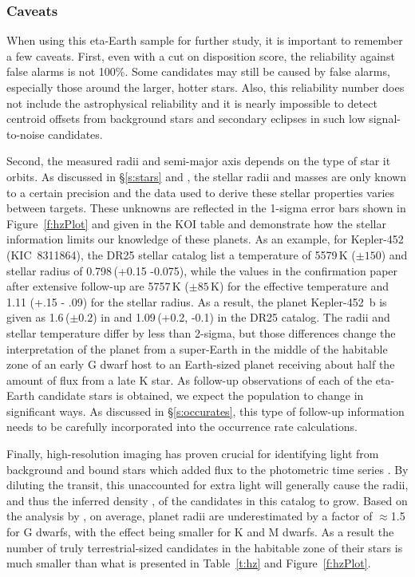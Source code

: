 \subsubsection{Caveats}
{\color{blue}
When using this eta-Earth sample for further study, it is important to remember a few caveats. First, even with a cut on disposition score, the reliability against false alarms is not 100\%. Some candidates may still be caused by false alarms, especially those around the larger, hotter stars. Also, this reliability number does not include the astrophysical reliability and it is nearly impossible to detect centroid offsets from background stars and secondary eclipses in such low signal-to-noise candidates. 

Second, the measured radii and semi-major axis depends on the type of star it orbits.  As discussed in \S\ref{s:stars} and \citet{Mathur2017ApJS}, the stellar radii and masses are only known to a certain precision and the data used to derive these stellar properties varies between targets.  These unknowns are reflected in the 1-sigma error bars shown in Figure~\ref{f:hzPlot} and given in the KOI table and demonstrate how the stellar information limits our knowledge of these planets.  As an example, for Kepler-452 (KIC~8311864), the DR25 stellar catalog list a temperature of 5579\,K ($\pm150$) and stellar radius of 0.798\,\rsun (+0.15 -0.075), while the values in the confirmation paper \citep{Jenkins2015} after extensive follow-up are 5757\,K ($\pm85$\,K) for the effective temperature and 1.11 (+.15 - .09) for the stellar radius.  As a result, the planet Kepler-452~b is given as 1.6\,\re ($\pm0.2$) in \citet{Jenkins2015} and 1.09\,\re (+0.2, -0.1) in the DR25 catalog. The radii and stellar temperature differ by less than 2-sigma, but those differences change the interpretation of the planet from a super-Earth in the middle of the habitable zone of an early G dwarf host to an Earth-sized planet receiving about half the amount of flux from a late K star.  As follow-up observations of each of the eta-Earth candidate stars is obtained, we expect the population to change in significant ways.  As discussed in \S\ref{s:occurates}, this type of follow-up information needs to be carefully incorporated into the occurrence rate calculations.


Finally, high-resolution imaging has proven crucial for identifying light from background and bound stars which added flux to the \Kepler{} photometric time series \citep{Furlan2017}. By diluting the transit, this unaccounted for extra light will generally cause the radii, and thus the inferred density \citep[see][]{Furlan2017densities}, of the candidates in this catalog to grow. Based on the analysis by \citet{Ciardi2015}, on average, planet radii are underestimated by a factor of $\approx$1.5 for G dwarfs, with the effect being smaller for K and M dwarfs. As a result the number of truly terrestrial-sized candidates in the habitable zone of their stars is much smaller than what is presented in Table~\ref{t:hz} and Figure~\ref{f:hzPlot}.



}





